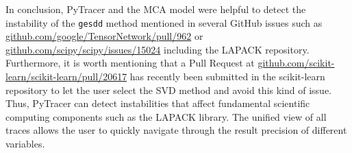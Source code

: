 \documentclass[10pt,journal,compsoc]{IEEEtran}
\newcommand{\pytracer}[0]{PyTracer\xspace}
\DeclareRobustCommand{\add}[1]{\textcolor{ao(english)}{#1}}%
\DeclareRobustCommand{\add}[1]{#1}
\begin{document}
In conclusion, \pytracer and the MCA model were helpful to detect the
instability of the \texttt{gesdd} method mentioned in several GitHub issues such as
\href{https://github.com/google/TensorNetwork/pull/962}{github.com/google/TensorNetwork/pull/962} or
\href{https://github.com/scipy/scipy/issues/15024}{github.com/scipy/scipy/issues/15024}
including the LAPACK repository. Furthermore, it is worth mentioning that a Pull
Request at \href{https://github.com/scikit-learn/scikit-learn/pull/20617}{github.com/scikit-learn/scikit-learn/pull/20617}
has recently been submitted in the scikit-learn repository to let the user select the SVD method and
avoid this kind of issue. Thus, \pytracer can detect instabilities that affect
fundamental scientific computing components such as the LAPACK library. \add{The
    unified view of all traces allows the user to quickly navigate through the
    \add{result} precision of different variables.}
\end{document}
